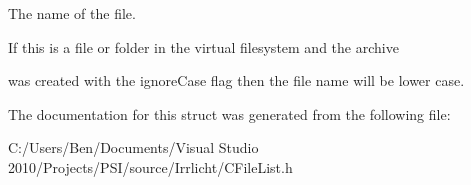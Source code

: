 The name of the file. 

\begin{DoxyVerb}If this is a file or folder in the virtual filesystem and the archive
\end{DoxyVerb}
 was created with the ignore\-Case flag then the file name will be lower case. 

The documentation for this struct was generated from the following file\-:\begin{DoxyCompactItemize}
\item 
C\-:/\-Users/\-Ben/\-Documents/\-Visual Studio 2010/\-Projects/\-P\-S\-I/source/\-Irrlicht/C\-File\-List.\-h\end{DoxyCompactItemize}
